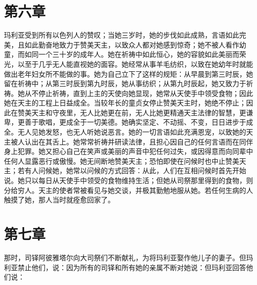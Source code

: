 
\section{第六章}

玛利亚受到所有以色列人的赞叹；当她三岁时，她的步伐如此成熟，言语如此完美，且如此勤奋地致力于赞美天主，以致众人都对她感到惊奇；她不被人看作幼童，而如同一个三十岁的成年人。她在祈祷中如此恒心，她的容貌如此美丽而荣光，以至于几乎无人能直视她的面容。她经常从事羊毛纺织，以致在她幼年时就能做出老年妇女所不能做的事。她为自己立下了这样的规矩：从早晨到第三时辰，她留在祈祷中；从第三时辰到第九时辰，她从事纺织；从第九时辰起，她又致力于祈祷。她从不停止祈祷，直到上主的天使向她显现，她常从天使手中领受食物；因此她在天主的工程上日益成全。当较年长的童贞女停止赞美天主时，她绝不停止；因此在赞美天主和守夜里，无人比她更在前，无人比她更精通天主法律的智慧，更谦卑，更善于歌唱，更成全于一切美德。她确实坚定、不动摇、不变，日日进步于成全。无人见她发怒，也无人听她说恶言。她的一切言语如此充满恩宠，以致她的天主被人认出在其舌上。她常常祈祷并研读法律，且担心因自己的任何言语而在同伴身上犯罪。她又担心自己在笑声或美丽的声音中犯任何过失，或因得意而向同辈中任何人显露恶行或傲慢。她无间断地赞美天主；恐怕即使在问候时也中止赞美天主；若有人问候她，她常以问候的方式回答：从此，人们在互相问候时首先开始说。她只以每日从天使手中领受的食物维持生活；但她从司祭那里得到的食物，则分给穷人。天主的使者常被看见与她交谈，并极其勤勉地服从她。若任何生病的人触摸了她，那人当时就痊愈回家了。\par


\section{第七章}

那时，司铎阿彼雅塔尔向大司祭们不断献礼，为将玛利亚娶作他儿子的妻子。但玛利亚禁止他们，说：因为所有的司铎和所有她的亲属不断对她说：但玛利亚回答他们说：\par

